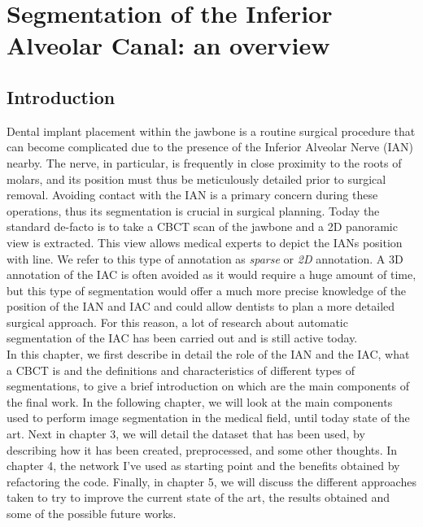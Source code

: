 
\chapter{Segmentation of the Inferior Alveolar Canal: an overview}

\label{chp:overview}

\def\:{\hskip0pt} %

\section{Introduction}
Dental implant placement within the jawbone is a routine surgical procedure that can become complicated due to the presence of the Inferior Alveolar Nerve (IAN) nearby. The nerve, in particular, is frequently in close proximity to the roots of molars, and its position must thus be meticulously detailed prior to surgical removal. Avoiding contact with the IAN is a primary concern during these operations, thus its segmentation is crucial in surgical planning.
Today the standard de-facto is to take a CBCT scan of the jawbone and a 2D panoramic view is extracted. This view allows medical experts to depict the IANs
position with line. We refer to this type of annotation as \emph{sparse} or \emph{2D} annotation. A 3D annotation of the IAC is often avoided as it would require a huge amount of time, but this type of segmentation would offer a much more precise knowledge of the position of the IAN and IAC and could allow dentists to plan a more detailed surgical approach. For this reason, a lot of research about automatic segmentation of the IAC has been carried out and is still active today.\\

In this chapter, we first describe in detail the role of the IAN and the IAC,
what a CBCT is and the definitions and characteristics of different types of
segmentations, to give a brief introduction on which are the main components of the final work.
In the following chapter, we will look at the main components used to perform
image segmentation in the medical field, until today state of the art.
Next in chapter 3, we will detail the dataset that has been used, by describing
how it has been created, preprocessed, and some other thoughts.
In chapter 4, the network I've used as starting point and the benefits obtained
by refactoring the code.
Finally, in chapter 5, we will discuss the different approaches taken to try to
improve the current state of the art, the results obtained and some of the
possible future works.

